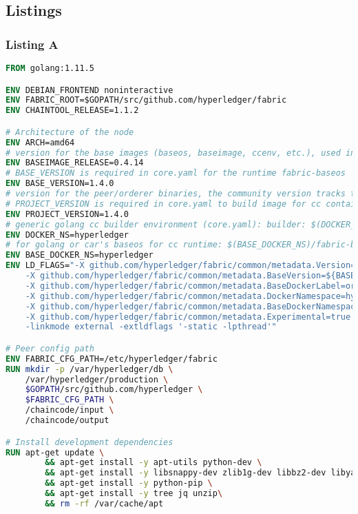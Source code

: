 \newpage
\subsection{Listings}
\subsubsection{Listing A}
\begin{lstlisting}[caption={Hyperledger Fabric Peer \textit{Dockerfile}},captionpos=b,language=Dockerfile,label=lst:dockerfile-hl-peer]
FROM golang:1.11.5

ENV DEBIAN_FRONTEND noninteractive
ENV FABRIC_ROOT=$GOPATH/src/github.com/hyperledger/fabric
ENV CHAINTOOL_RELEASE=1.1.2

# Architecture of the node
ENV ARCH=amd64
# version for the base images (baseos, baseimage, ccenv, etc.), used in core.yaml as BaseVersion
ENV BASEIMAGE_RELEASE=0.4.14
# BASE_VERSION is required in core.yaml for the runtime fabric-baseos
ENV BASE_VERSION=1.4.0
# version for the peer/orderer binaries, the community version tracks the hash value like 1.0.0-snapshot-51b7e85
# PROJECT_VERSION is required in core.yaml to build image for cc container
ENV PROJECT_VERSION=1.4.0
# generic golang cc builder environment (core.yaml): builder: $(DOCKER_NS)/fabric-ccenv:$(ARCH)-$(PROJECT_VERSION)
ENV DOCKER_NS=hyperledger
# for golang or car's baseos for cc runtime: $(BASE_DOCKER_NS)/fabric-baseos:$(ARCH)-$(BASEIMAGE_RELEASE)
ENV BASE_DOCKER_NS=hyperledger
ENV LD_FLAGS="-X github.com/hyperledger/fabric/common/metadata.Version=${BASE_VERSION} \
    -X github.com/hyperledger/fabric/common/metadata.BaseVersion=${BASEIMAGE_RELEASE} \
    -X github.com/hyperledger/fabric/common/metadata.BaseDockerLabel=org.hyperledger.fabric \
    -X github.com/hyperledger/fabric/common/metadata.DockerNamespace=hyperledger \
    -X github.com/hyperledger/fabric/common/metadata.BaseDockerNamespace=hyperledger \
    -X github.com/hyperledger/fabric/common/metadata.Experimental=true \
    -linkmode external -extldflags '-static -lpthread'"

# Peer config path
ENV FABRIC_CFG_PATH=/etc/hyperledger/fabric
RUN mkdir -p /var/hyperledger/db \
    /var/hyperledger/production \
    $GOPATH/src/github.com/hyperledger \
    $FABRIC_CFG_PATH \
    /chaincode/input \
    /chaincode/output

# Install development dependencies
RUN apt-get update \
        && apt-get install -y apt-utils python-dev \
        && apt-get install -y libsnappy-dev zlib1g-dev libbz2-dev libyaml-dev libltdl-dev libtool \
        && apt-get install -y python-pip \
        && apt-get install -y tree jq unzip\
        && rm -rf /var/cache/apt


\end{lstlisting}
